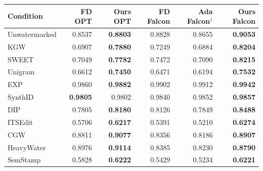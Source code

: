 \begin{tabular}{@{}lrrrrr@{}}
\toprule
Condition & FD OPT & Ours OPT & FD Falcon & Ada Falcon$^\dagger$ & Ours Falcon \\
\midrule
Unwatermarked & 0.8537 & \textbf{0.8803} & 0.8828 & 0.8655 & \textbf{0.9053} \\
KGW & 0.6907 & \textbf{0.7880} & 0.7249 & 0.6884 & \textbf{0.8204} \\
SWEET & 0.7049 & \textbf{0.7782} & 0.7472 & 0.7090 & \textbf{0.8215} \\
Unigram & 0.6612 & \textbf{0.7450} & 0.6471 & 0.6194 & \textbf{0.7532} \\
EXP & 0.9860 & \textbf{0.9882} & 0.9902 & 0.9912 & \textbf{0.9942} \\
SynthID & \textbf{0.9805} & 0.9802 & 0.9840 & 0.9852 & \textbf{0.9857} \\
DIP & 0.7805 & \textbf{0.8180} & 0.8126 & 0.7849 & \textbf{0.8488} \\
ITSEdit & 0.5706 & \textbf{0.6217} & 0.5391 & 0.5210 & \textbf{0.6274} \\
CGW & 0.8811 & \textbf{0.9077} & 0.8356 & 0.8186 & \textbf{0.8907} \\
HeavyWater & 0.8976 & \textbf{0.9114} & 0.8385 & 0.8230 & \textbf{0.8790} \\
SemStamp & 0.5828 & \textbf{0.6222} & 0.5429 & 0.5234 & \textbf{0.6221} \\
\bottomrule
\end{tabular}
